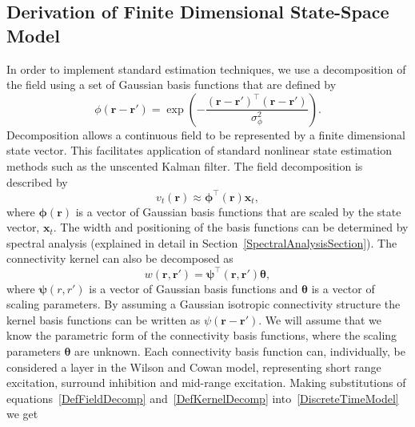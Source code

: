 \documentclass[twocolumn,11pt,a4paper]{article}		%
\begin{document}
\subsection{Derivation of Finite Dimensional State-Space Model} 
In order to implement standard estimation techniques, we use a decomposition of the field using a set of Gaussian basis functions that are defined by
\begin{equation}\label{eq:FieldBasisFunction}
	\phi\left(\mathbf{r}-\mathbf{r}'\right) =
\exp{\left(-\frac{(\mathbf{r}-\mathbf{r}')^\top(\mathbf{r}-\mathbf{r}')}{\sigma_{\phi}^2}\right)}. 
\end{equation}
Decomposition allows a continuous field to be represented by a finite dimensional state vector. This facilitates application of standard nonlinear state estimation methods such as the unscented Kalman filter. The field decomposition is described by 
\begin{equation}
	\label{DefFieldDecomp} v_t\left(\mathbf{r}\right) \approx \boldsymbol{\phi}^{\top}\left(\mathbf{r}\right) \mathbf{x}_t, 
\end{equation}
where $\mathbf{\boldsymbol{\phi}}(\mathbf{r})$ is a vector of Gaussian basis functions that are scaled by the state vector, $\mathbf{x}_t$. %
The width and positioning of the basis functions can be determined by spectral analysis (explained in detail in Section~\ref{SpectralAnalysisSection}). The connectivity kernel can also be decomposed as 
\begin{equation}\label{DefKernelDecomp}
	 w\left(\mathbf{r},\mathbf{r}'\right) =\boldsymbol{\psi}^\top\left(\mathbf{r},\mathbf{r}'\right) \boldsymbol{\theta},
\end{equation}
where $\boldsymbol{\psi}(r,r')$ is a vector of Gaussian basis functions and $\boldsymbol{\theta}$ is a vector of scaling parameters. By assuming a Gaussian isotropic connectivity structure the kernel basis functions can be written as $\psi(\mathbf{r}-\mathbf{r}')$. We will assume that we know the parametric form of the connectivity basis functions, where the scaling parameters $\boldsymbol{\theta}$ are unknown. Each connectivity basis function can, individually, be considered a layer in the Wilson and Cowan model, representing short range excitation, surround inhibition and mid-range excitation. Making substitutions of equations~\ref{DefFieldDecomp} and~\ref{DefKernelDecomp} into~\ref{DiscreteTimeModel} we get 
\end{document}
